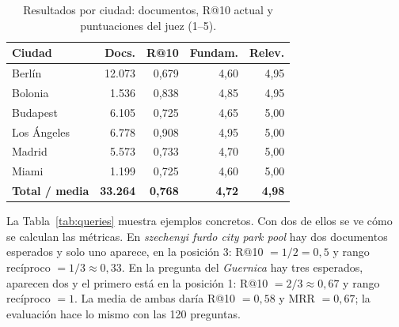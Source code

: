 \begin{table}[h]
\centering\scriptsize
\caption{Resultados por ciudad: documentos, R@10 actual y puntuaciones del juez (1--5).}\label{tab:ciudades}
\begin{tabularx}{\columnwidth}{@{}Yrrrr@{}}
\toprule
\textbf{Ciudad} & \textbf{Docs.} & \textbf{R@10} & \textbf{Fundam.} & \textbf{Relev.} \\
\midrule
Berlín & 12.073 & 0,679 & 4,60 & 4,95 \\
Bolonia & 1.536 & 0,838 & 4,85 & 4,95 \\
Budapest & 6.105 & 0,725 & 4,65 & 5,00 \\
Los Ángeles & 6.778 & 0,908 & 4,95 & 5,00 \\
Madrid & 5.573 & 0,733 & 4,70 & 5,00 \\
Miami & 1.199 & 0,725 & 4,60 & 5,00 \\
\midrule
\textbf{Total / media} & \textbf{33.264} & \textbf{0,768} & \textbf{4,72} & \textbf{4,98} \\
\bottomrule
\end{tabularx}
\end{table}

La Tabla~\ref{tab:queries} muestra ejemplos concretos. Con dos de ellos se ve cómo se calculan las
métricas. En \emph{szechenyi furdo city park pool} hay dos documentos esperados y solo uno aparece,
en la posición 3: R@10 $=1/2=0{,}5$ y rango recíproco $=1/3\approx0{,}33$. En la pregunta del
\emph{Guernica} hay tres esperados, aparecen dos y el primero está en la posición 1: R@10
$=2/3\approx0{,}67$ y rango recíproco $=1$. La media de ambas daría R@10 $=0{,}58$ y MRR
$=0{,}67$; la evaluación hace lo mismo con las 120 preguntas.

